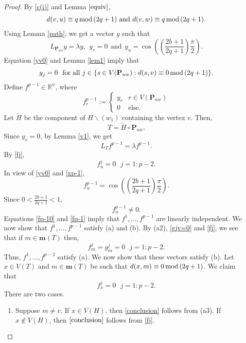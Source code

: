 \documentclass[preprint,12pt]{elsarticle}
\newcommand{\rr}{\mathbb{R}}
\newcommand{\1}{\mathbf{1}}
\newcommand{\0}{\mathbf{0}}
\newcommand{\p}{{\mathbf{P}}}
\def\m{\mathbf{m}}
\def\p{\mathbf{P}}
\begin{document}
\begin{proof}
By \eqref{c(i)} and Lemma $\eqref{equiv}$,
$$d(v,u)\equiv q\,{\rm{mod}}\,(2q+1)~\text{and}~d(v,w)\equiv q\,{\rm{mod}}\,(2q+1).$$ 
Using Lemma \ref{path}, we get
a vector $y$ such that 
\begin{equation}\label{yv0}
L_{\p_{uw}}y=\lambda y,~~ y_v=0~~\mbox{and}~~y_u=\cos\left( \left(\frac{2b+1}{2q+1}\right)\frac{\pi}{2} \right).    
\end{equation}
Equation \eqref{yv0} and Lemma \ref{lem1} imply that
\begin{equation} \label{d(s,v)}
y_j=0~~\mbox{for all}~j \in \{s \in V(\p_{uw}):d(s,v) \equiv 0\,{\rm{mod}}\, (2q+1)\}.
\end{equation}
Define $f^{p-1}\in \rr^n$, where
\begin{equation}\label{xp-1}
f^{p-1}_r:=
\begin{cases}
y_r & r\in V(\p_{uw}) \\
0 & \mbox{else.}
\end{cases}    
\end{equation}
Let $\widetilde{H}$ be the component of $H \smallsetminus (w_1)$ containing the vertex $v$.
Then, \[T=\widetilde{H} \circ \p_{uw}.\]
Since $y_v=0$, by Lemma \ref{v1}, we get
\[L_Tf^{p-1}=\lambda f^{p-1}.\]
By \eqref{fj},
\begin{equation} \label{fp-10}
f^{j}_u=0 ~~~ j=1:p-2.
\end{equation}
In view of \eqref{yv0} and \eqref{xp-1},
\[f^{p-1}_u=\cos\left(\left( \frac{2b+1}{2q+1}\right)\frac{\pi}{2} \right).\] 
Since $0<\frac{2b+1}{2q+1}<1$, 
\begin{equation} \label{fp-1}
f^{p-1}_u \neq 0.
\end{equation}
Equations
\eqref{fp-10} and \eqref{fp-1} imply that 
$f^1,\dotsc,f^{p-1}$ are linearly independent. 
We now show that 
$f^1,\dotsc,f^{p-1}$ satisfy
(a) and (b). 
By (a2), \eqref{gjv=0} and \eqref{fj}, we see that if $m \in \m(T)$ then,
\[f^j_m=g^j_m=0~~~j=1:p-2.\] Thus, $f^1,\dotsc,f^{p-2}$ satisfy
(a). 
We now show that these vectors satisfy (b).
Let $x \in V(T)$ and $m \in \m(T)$ be such that 
$d(x,m) \equiv 0\,{\rm{mod}}\,(2q+1)$.
We claim that
\begin{equation} \label{conclusion}
f^{j}_x=0~~~j=1:p-2.
\end{equation}
There are two cases.
\begin{enumerate}
    \item[(c1)] Suppose $m\neq v$. If $x\in V(H)$, then 
    \eqref{conclusion} follows from (a3). If $x\notin V(H)$, then $\eqref{conclusion}$ follows
    from \eqref{fj}.

\end{enumerate}
\end{proof}
\end{document}
